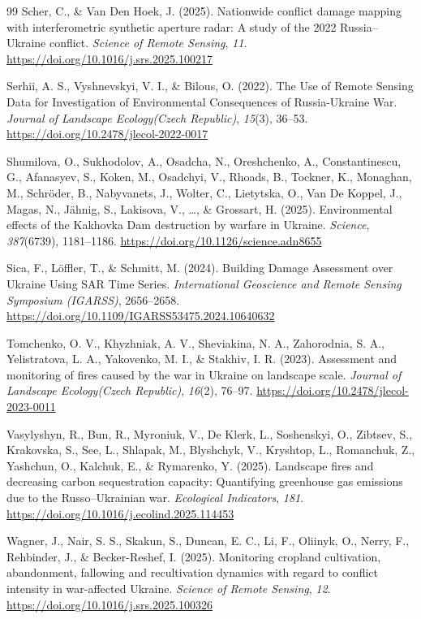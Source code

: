 \documentclass[12pt, a4paper]{article}
\begin{document}
\begin{thebibliography}{99}
Scher, C., \& Van Den Hoek, J. (2025). Nationwide conflict damage mapping with interferometric synthetic aperture radar: A study of the 2022 Russia–Ukraine conflict. \textit{Science of Remote Sensing}, \textit{11}. \url{https://doi.org/10.1016/j.srs.2025.100217}

Serhii, A. S., Vyshnevskyi, V. I., \& Bilous, O. (2022). The Use of Remote Sensing Data for Investigation of Environmental Consequences of Russia-Ukraine War. \textit{Journal of Landscape Ecology(Czech Republic)}, \textit{15}(3), 36--53. \url{https://doi.org/10.2478/jlecol-2022-0017}

Shumilova, O., Sukhodolov, A., Osadcha, N., Oreshchenko, A., Constantinescu, G., Afanasyev, S., Koken, M., Osadchyi, V., Rhoads, B., Tockner, K., Monaghan, M., Schröder, B., Nabyvanets, J., Wolter, C., Lietytska, O., Van De Koppel, J., Magas, N., Jähnig, S., Lakisova, V., \ldots, \& Grossart, H. (2025). Environmental effects of the Kakhovka Dam destruction by warfare in Ukraine. \textit{Science}, \textit{387}(6739), 1181--1186. \url{https://doi.org/10.1126/science.adn8655}

Sica, F., Löffler, T., \& Schmitt, M. (2024). Building Damage Assessment over Ukraine Using SAR Time Series. \textit{International Geoscience and Remote Sensing Symposium (IGARSS)}, 2656--2658. \url{https://doi.org/10.1109/IGARSS53475.2024.10640632}

Tomchenko, O. V., Khyzhniak, A. V., Sheviakina, N. A., Zahorodnia, S. A., Yelistratova, L. A., Yakovenko, M. I., \& Stakhiv, I. R. (2023). Assessment and monitoring of fires caused by the war in Ukraine on landscape scale. \textit{Journal of Landscape Ecology(Czech Republic)}, \textit{16}(2), 76--97. \url{https://doi.org/10.2478/jlecol-2023-0011}

Vasylyshyn, R., Bun, R., Myroniuk, V., De Klerk, L., Soshenskyi, O., Zibtsev, S., Krakovska, S., See, L., Shlapak, M., Blyshchyk, V., Kryshtop, L., Romanchuk, Z., Yashchun, O., Kalchuk, E., \& Rymarenko, Y. (2025). Landscape fires and decreasing carbon sequestration capacity: Quantifying greenhouse gas emissions due to the Russo–Ukrainian war. \textit{Ecological Indicators}, \textit{181}. \url{https://doi.org/10.1016/j.ecolind.2025.114453}

Wagner, J., Nair, S. S., Skakun, S., Duncan, E. C., Li, F., Oliinyk, O., Nerry, F., Rehbinder, J., \& Becker-Reshef, I. (2025). Monitoring cropland cultivation, abandonment, fallowing and   recultivation dynamics with regard to conflict intensity in war-affected   Ukraine. \textit{Science of Remote Sensing}, \textit{12}. \url{https://doi.org/10.1016/j.srs.2025.100326}


\end{thebibliography}
\end{document}
